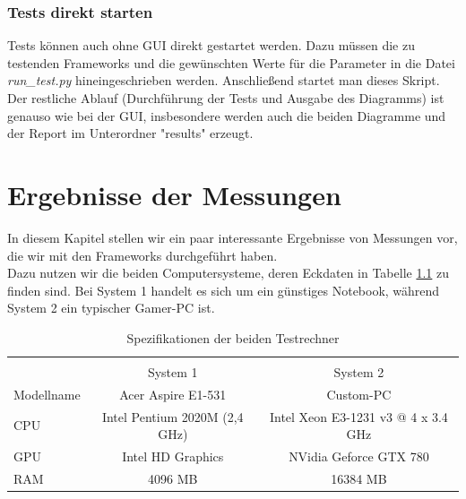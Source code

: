\subsection{Tests direkt starten}
Tests können auch ohne GUI direkt gestartet werden. Dazu müssen die zu testenden Frameworks und die gewünschten Werte für die Parameter in die Datei \textit{run\_test.py} hineingeschrieben werden. Anschließend startet man dieses Skript. Der restliche Ablauf (Durchführung der Tests und Ausgabe des Diagramms) ist genauso wie bei der GUI, insbesondere werden auch die beiden Diagramme und der Report im Unterordner "results" erzeugt.

\chapter{Ergebnisse der Messungen}
\label{ch:results}
In diesem Kapitel stellen wir ein paar interessante Ergebnisse von Messungen vor, die wir mit den Frameworks durchgeführt haben.\\
Dazu nutzen wir die beiden Computersysteme, deren Eckdaten in Tabelle \ref{tab:allspecs} zu finden sind. Bei System 1 handelt es sich um ein günstiges Notebook, während System 2 ein typischer Gamer-PC ist.

\begin{table}
    \begin{tabular}{ | l | c | c |}
    \hline \\
    			& System 1						& System 2      						\\ \hline
    Modellname 	& Acer Aspire E1-531			& Custom-PC 							\\ \hline
    CPU 		& Intel Pentium 2020M (2,4 GHz) & Intel Xeon E3-1231 v3 @ 4 x 3.4 GHz 	\\ \hline
    GPU 		& Intel HD Graphics				& NVidia Geforce GTX 780				\\ \hline
    RAM 		& 4096 MB						& 16384 MB 								\\ \hline
    \end{tabular}
    \caption{Spezifikationen der beiden Testrechner}
   	\label{tab:allspecs}
\end{table}

